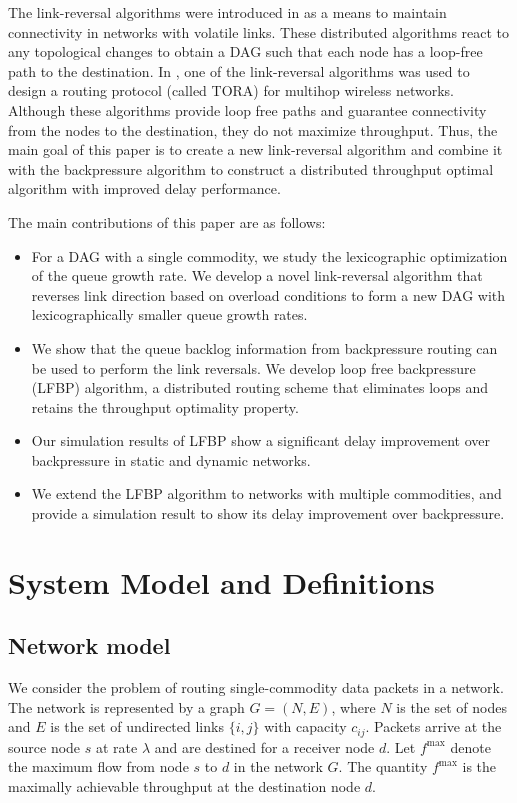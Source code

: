 \documentclass{sig-alternate-2013}
\begin{document}
The link-reversal algorithms were introduced in \cite{gafni_bertsekas} as a means to maintain connectivity in networks with volatile links.  These distributed algorithms react to any topological changes to obtain a DAG such that each node has a loop-free path  to the destination.  In \cite{tora}, one of the link-reversal algorithms was used to design a routing protocol (called TORA) for multihop wireless networks. Although these algorithms provide loop free paths and guarantee connectivity from the nodes to the destination, they do not maximize throughput. Thus, the main goal of this paper is to create a new link-reversal algorithm and combine it with the backpressure algorithm to construct a distributed throughput optimal algorithm with improved delay performance.


The main contributions of this paper are as follows:
\begin{itemize}
\itemsep0em 
\item  For a DAG with a single commodity, we study the  lexicographic optimization of the queue growth rate.
We develop a novel link-reversal algorithm that reverses link direction based on overload conditions to form a new DAG
with lexicographically smaller queue growth rates. 
\item We show that the queue backlog information from backpressure routing can be used to perform the link reversals. We develop loop free backpressure (LFBP) algorithm, a  distributed routing scheme  that eliminates loops and  retains the throughput optimality property.
\item Our simulation results of LFBP show a significant delay improvement over backpressure in static and dynamic networks. 
\item We extend the LFBP algorithm to networks with multiple commodities, and provide a simulation result to show its delay improvement over backpressure.
 \end{itemize}









\section{System Model and Definitions}
\subsection{Network model}
We consider the problem of routing single-commodity data packets in a network. The network is represented by a graph $G=(N,E)$, where $N$ is the set of nodes and $E$ is the set of undirected links $\{i, j\}$ with capacity $c_{ij}$. Packets arrive at the source node $s$ at rate $\lambda$  and are destined for a receiver node $d$.  Let $f^{\max}$ denote the maximum flow from node $s$ to  $d$ in the network $G$.
The quantity $f^{\max}$ is the maximally achievable throughput at the destination node $d$. 
\end{document}
